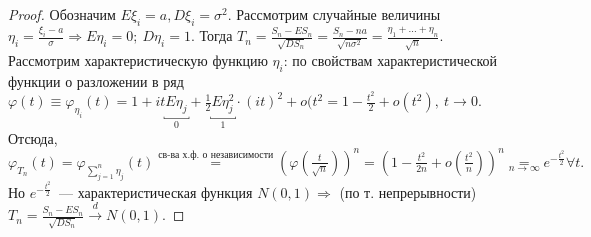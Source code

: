 	\begin{proof}
		Обозначим \(E\xi_i = a, D\xi_i = \sigma^2.\)
		Рассмотрим случайные величины \(\eta_i = \frac{\xi_i - a}{\sigma} \Rightarrow 
		E\eta_i = 0; ~ D\eta_i = 1.\)
		Тогда \(T_n = \frac{S_n - ES_n}{\sqrt{DS_n}} = \frac{S_n - na}{\sqrt{n\sigma^2}} = \frac{\eta_1 + \ldots + \eta_n}{\sqrt{n}}.\)
		Рассмотрим характеристическую функцию \(\eta_i\): по свойствам характеристической функции о разложении в ряд \(\varphi(t) \equiv \varphi_{\eta_i}(t) = 1 + it\underbracket{E\eta_j}_{0} + \frac{1}{2}\underbracket{E\eta_j^2}_1\cdot(it)^2 + o(t^2 = 1 - \frac{t^2}{2} + o(t^2), ~ t \to 0.\) Отсюда, \(\varphi_{T_n}(t) = \varphi_{\sum\limits_{j = 1}^{n}\eta_j}(t) \overset{\text{св-ва х.ф. о независимости}}{=} \left(\varphi\left(\frac{t}{\sqrt{n}}\right)\right)^n = \left(1 - \frac{t^2}{2n} + o\left(\frac{t^2}{n}\right)\right)^n \underset{n \to \infty}{=} e^{- \frac{t^2}{2}} \forall t. \)Но \(e^{-\frac{t^2}{2}}\)~--- характеристическая функция \(N(0,1) \Rightarrow\) (по т. непрерывности) \(T_n = \frac{S_n - ES_n}{\sqrt{DS_n}} \overset{d}{\longrightarrow} N(0,1).\)
	\end{proof}